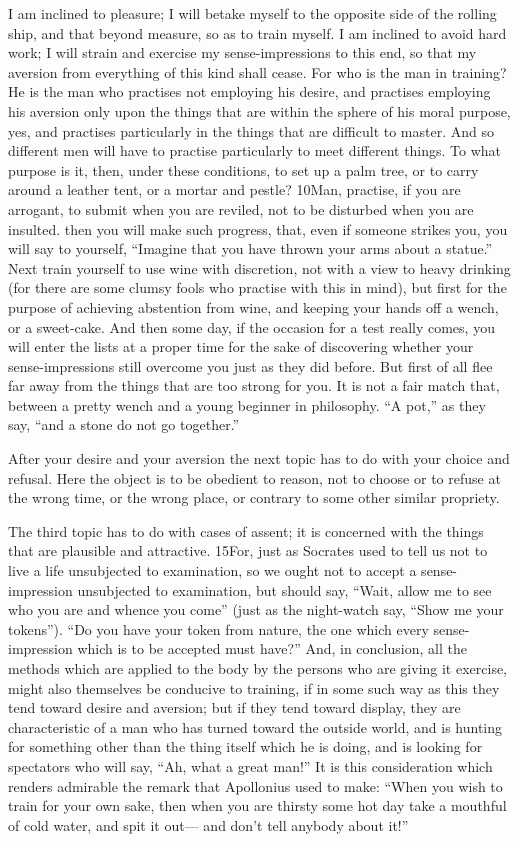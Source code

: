 I am inclined to pleasure; I will betake myself to the opposite side of the rolling ship, and that beyond measure, so as to train myself. I am inclined to avoid hard work; I will strain and exercise my sense-impressions to this end, so that my aversion from everything of this kind shall cease. For who is the man in training? He is the man who practises not employing his desire, and practises employing his aversion only upon the things that are within the sphere of his moral purpose, yes, and practises particularly in the things that are difficult to master. And so different men will have to practise particularly to meet different things. To what purpose is it, then, under these conditions, to set up a palm tree, or to carry around a leather tent, or a mortar and pestle? 10Man, practise, if you are arrogant, to submit when you are reviled, not to be disturbed when you are insulted. then you will make such progress, that, even if someone strikes you, you will say to yourself, ``Imagine that you have thrown your arms about a statue.'' Next train yourself to use wine with discretion, not with a view to heavy drinking (for there are some clumsy fools who practise with this in mind), but first for the purpose of achieving abstention from wine, and keeping your hands off a wench, or a sweet-cake. And then some day, if the occasion for a test really comes, you will enter the lists at a proper time for the sake of discovering whether your sense-impressions still overcome you just as they did before. But first of all flee far away from the things that are too strong for you. It is not a fair match that, between a pretty wench and a young beginner in philosophy. ``A pot,'' as they say, ``and a stone do not go together.''

After your desire and your aversion the next topic has to do with your choice and refusal. Here the object is to be obedient to reason, not to choose or to refuse at the wrong time, or the wrong place, or contrary to some other similar propriety.

The third topic has to do with cases of assent; it is concerned with the things that are plausible and attractive. 15For, just as Socrates used to tell us not to live a life unsubjected to examination, so we ought not to accept a sense-impression unsubjected to examination, but should say, ``Wait, allow me to see who you are and whence you come'' (just as the night-watch say, ``Show me your tokens''). ``Do you have your token from nature, the one which every sense-impression which is to be accepted must have?'' And, in conclusion, all the methods which are applied to the body by the persons who are giving it exercise, might also themselves be conducive to training, if in some such way as this they tend toward desire and aversion; but if they tend toward display, they are characteristic of a man who has turned toward the outside world, and is hunting for something other than the thing itself which he is doing, and is looking for spectators who will say, ``Ah, what a great man!'' It is this consideration which renders admirable the remark that Apollonius used to make: ``When you wish to train for your own sake, then when you are thirsty some hot day take a mouthful of cold water, and spit it out— and don't tell anybody about it!''

